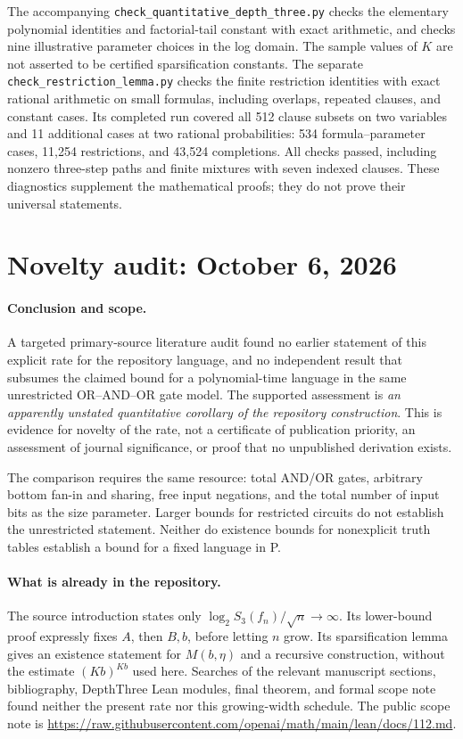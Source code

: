 \documentclass[11pt]{article}
\begin{document}
The accompanying \texttt{check\_quantitative\_depth\_three.py} checks the
elementary polynomial identities and factorial-tail constant with exact
arithmetic, and checks nine illustrative parameter choices in the log
domain. The sample values of $K$ are not asserted to be certified
sparsification constants. The separate
\texttt{check\_restriction\_lemma.py} checks the finite restriction
identities with exact rational arithmetic on small formulas, including
overlaps, repeated clauses, and constant cases. Its completed run covered
all 512 clause subsets on two variables and 11 additional cases at two
rational probabilities: 534 formula--parameter cases, 11,254 restrictions,
and 43,524 completions. All checks passed, including nonzero three-step
paths and finite mixtures with seven indexed clauses. These diagnostics supplement
the mathematical proofs; they do not prove their universal statements.

\section{Novelty audit: October 6, 2026}

\paragraph{Conclusion and scope.}
A targeted primary-source literature audit found no earlier statement of
this explicit rate for the repository language, and no independent result
that subsumes the claimed bound for a polynomial-time language in the same
unrestricted OR--AND--OR gate model. The supported assessment is
\emph{an apparently unstated quantitative corollary of the repository
construction}. This is evidence for novelty of the rate, not a certificate
of publication priority, an assessment of journal significance, or proof
that no unpublished derivation exists.

The comparison requires the same resource: total AND/OR gates, arbitrary
bottom fan-in and sharing, free input negations, and the total number of
input bits as the size parameter. Larger bounds for restricted circuits
do not establish the unrestricted statement. Neither do existence bounds
for nonexplicit truth tables establish a bound for a fixed language in P.

\paragraph{What is already in the repository.}
The source introduction states only
$\log_2 S_3(f_n)/\sqrt n\to\infty$. Its lower-bound proof expressly fixes
$A$, then $B,b$, before letting $n$ grow. Its sparsification lemma gives
an existence statement for $M(b,\eta)$ and a recursive construction,
without the estimate $(Kb)^{Kb}$ used here. Searches of the relevant
manuscript sections, bibliography, DepthThree Lean modules, final theorem,
and formal scope note found neither the present rate nor this growing-width
schedule. The public scope note is
\url{https://raw.githubusercontent.com/openai/math/main/lean/docs/112.md}.
\end{document}
